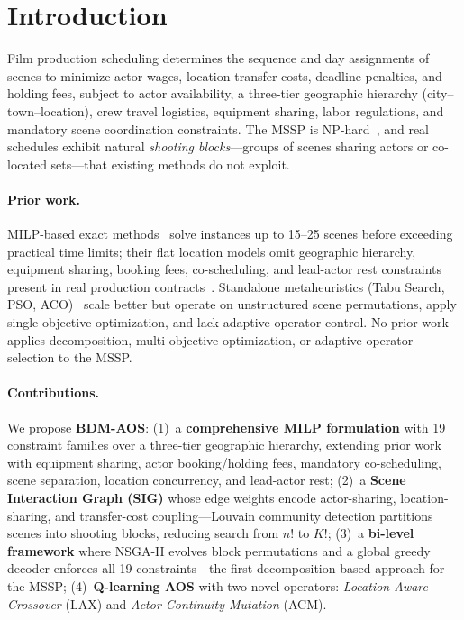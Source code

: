 \section{Introduction}
\label{sec:intro}

Film production scheduling determines the sequence and day assignments of scenes to minimize actor wages, location transfer costs, deadline penalties, and holding fees, subject to actor availability, a three-tier geographic hierarchy (city--town--location), crew travel logistics, equipment sharing, labor regulations, and mandatory scene coordination constraints.
The MSSP is NP-hard~\citep{brucker1999}, and real schedules exhibit natural \emph{shooting blocks}---groups of scenes sharing actors or co-located sets---that existing methods do not exploit.

\paragraph{Prior work.}
MILP-based exact methods~\citep{liu2019,tekin2023} solve instances up to 15--25 scenes before exceeding practical time limits; their flat location models omit geographic hierarchy, equipment sharing, booking fees, co-scheduling, and lead-actor rest constraints present in real production contracts~\citep{bomsdorf2008}.
Standalone metaheuristics (Tabu Search, PSO, ACO)~\citep{liu2019,long2020,tekin2023} scale better but operate on unstructured scene permutations, apply single-objective optimization, and lack adaptive operator control.
No prior work applies decomposition, multi-objective optimization, or adaptive operator selection to the MSSP.

\paragraph{Contributions.}
We propose \textbf{BDM-AOS}:
(1)~a \textbf{comprehensive MILP formulation} with 19 constraint families over a three-tier geographic hierarchy, extending prior work with equipment sharing, actor booking/holding fees, mandatory co-scheduling, scene separation, location concurrency, and lead-actor rest;
(2)~a \textbf{Scene Interaction Graph (SIG)} whose edge weights encode actor-sharing, location-sharing, and transfer-cost coupling---Louvain community detection partitions scenes into shooting blocks, reducing search from $n!$ to $K!$;
(3)~a \textbf{bi-level framework} where NSGA-II evolves block permutations and a global greedy decoder enforces all 19 constraints---the first decomposition-based approach for the MSSP;
(4)~\textbf{Q-learning AOS} with two novel operators: \emph{Location-Aware Crossover} (LAX) and \emph{Actor-Continuity Mutation} (ACM).
